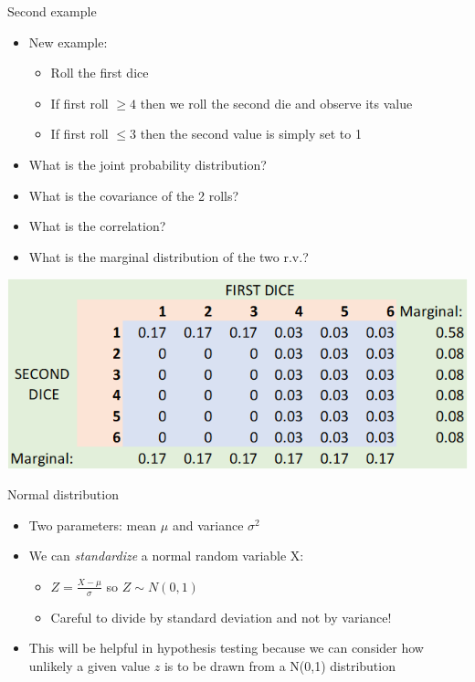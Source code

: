 \documentclass[aspectratio=169]{beamer}
\begin{document}
\begin{frame}{Second example}
    \begin{itemize}
        \item New example: 
        \begin{itemize}
            \item Roll the first dice
            \item If first roll $\geq 4$ then we roll the second die and observe its value
            \item If first roll $\leq 3$ then the second value is simply set to 1
        \end{itemize}
        \item What is the joint probability distribution?
        \item What is the covariance of the 2 rolls?
        \item What is the correlation?
        \item What is the marginal distribution of the two r.v.?
    \end{itemize}
\end{frame}

\begin{frame}
    \centering
    \includegraphics[width = 1\textwidth,keepaspectratio]{marginal.png}
\end{frame}

\begin{frame}{Normal distribution}
    \begin{itemize}
        \item Two parameters: mean $\mu$ and variance $\sigma^2$
        \item We can \textit{standardize} a normal random variable X:
        \begin{itemize}
            \item $Z = \frac{X-\mu}{\sigma}$ so $Z \sim N(0,1)$
            \item Careful to divide by standard deviation and not by variance!
        \end{itemize}
        \item This will be helpful in hypothesis testing because we can consider how unlikely a given value $z$ is to be drawn from a N(0,1) distribution
    \end{itemize}
\end{frame}
\end{document}
